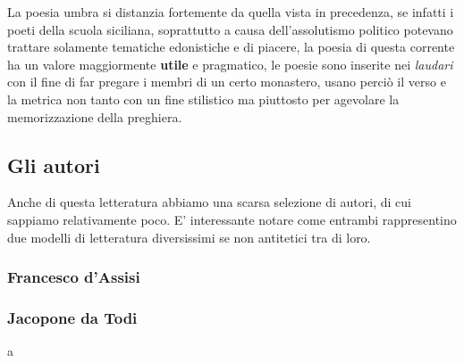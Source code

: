 \documentclass[a4paper, 11pt]{article}
\begin{document}
La poesia umbra si distanzia fortemente da quella vista in precedenza, se infatti i poeti della scuola siciliana, soprattutto a causa dell'assolutismo politico potevano trattare solamente tematiche edonistiche e di piacere, la poesia di questa corrente ha un valore maggiormente \textbf{utile} e pragmatico, le poesie sono inserite nei \textit{laudari} con il fine di far pregare i membri di un certo monastero, usano perciò il verso e la metrica non tanto con un fine stilistico ma piuttosto per agevolare la memorizzazione della preghiera.

\subsection{Gli autori}
Anche di questa letteratura abbiamo una scarsa selezione di autori, di cui sappiamo relativamente poco. E' interessante notare come entrambi rappresentino due modelli di letteratura diversissimi se non antitetici tra di loro.
\subsubsection{Francesco d'Assisi}
\subsubsection{Jacopone da Todi}
a
\end{document}
